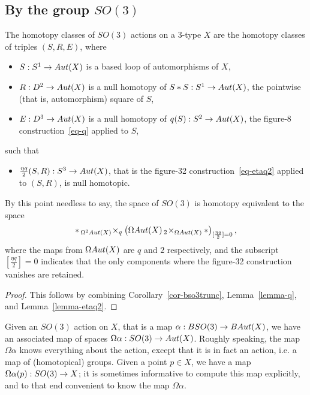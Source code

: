 \documentclass{amsart}
\begin{document}

\subsection{By the group $SO(3)$}

\begin{theorem} \label{thm-so3action}
The homotopy classes of $SO(3)$ actions on a 3-type $X$ are the homotopy classes of triples $(S,R,E)$, where 
\begin{itemize}
\item $S: S^1 \rightarrow Aut(X)$ is a based loop of automorphisms of $X$,
\item $R: D^2 \rightarrow Aut(X)$ is a null homotopy of $S \ast S: S^1 \rightarrow Aut(X)$, the pointwise (that is, automorphism) square of $S$,
\item $E: D^3 \rightarrow Aut(X)$ is a null homotopy of $q(S): S^2 \rightarrow Aut(X)$, the figure-8 construction~\eqref{eq-q} applied to $S$,
\end{itemize}
such that
\begin{itemize}
\item $\frac{\eta q}{2} (S,R) : S^3 \rightarrow Aut(X)$, that is the figure-32 construction~\eqref{eq-etaq2} applied to $(S,R)$, is null homotopic.
\end{itemize}
\end{theorem}
\nid By this point needless to say, the space of $SO(3)$ is homotopy equivalent to the space
\begin{equation} \nonumber
\ast \,_{\Omega^2 Aut(X)}\! \times_q \left(\Omega Aut(X) \,_2\! \times_{\Omega Aut(X)} \ast\right)_{[\frac{\eta q}{2}]=0},
\end{equation}
where the maps from $\Omega Aut(X)$ are $q$ and $2$ respectively, and the subscript $[\frac{\eta q}{2}]=0$ indicates that the only components where the figure-32 construction vanishes are retained.
\begin{proof}
This follows by combining Corollary~\ref{cor-bso3trunc}, Lemma~\ref{lemma-q}, and Lemma~\ref{lemma-etaq2}.
\end{proof}

Given an $SO(3)$ action on $X$, that is a map $\alpha: BSO(3) \rightarrow BAut(X)$, we have an associated map of spaces $\Omega \alpha: SO(3) \rightarrow Aut(X)$.  Roughly speaking, the map $\Omega \alpha$ knows everything about the action, except that it is in fact an action, i.e. a map of (homotopical) groups.  Given a point $p \in X$, we have a map $\Omega \alpha (p) : SO(3) \rightarrow X$; it is sometimes informative to compute this map explicitly, and to that end convenient to know the map $\Omega \alpha$.  
\end{document}

